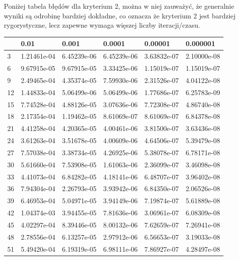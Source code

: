 \documentclass{article}
\begin{document}
Poniżej tabela błędów dla kryterium 2, można w niej zauważyć, że generalnie wyniki są odrobinę bardziej dokładne,
co oznacza że kryterium 2 jest bardziej rygorystyczne, lecz zapewne wymaga więszej liczby iteracji/czasu.

\newpage
\thispagestyle{empty}

\begin{table}[H]
\centering
\begin{tabular}{|l|l|l|l|l|l|}
\hline
& 0.01 & 0.001 & 0.0001 & 0.00001 & 0.000001 \\ \hline
3 & 1.21461e-04 & 6.45239e-06 & 6.45239e-06 & 3.63832e-07 & 2.10000e-08 \\ \hline
6 & 9.67915e-05 & 9.67915e-05 & 3.33425e-06 & 1.15019e-07 & 1.15019e-07 \\ \hline
9 & 2.49465e-04 & 4.35374e-05 & 7.59930e-06 & 2.31526e-07 & 4.04122e-08 \\ \hline
12 & 1.44833e-04 & 5.06499e-06 & 5.06499e-06 & 1.77686e-07 & 6.25783e-09 \\ \hline
15 & 7.74528e-04 & 4.88126e-05 & 3.07636e-06 & 7.72308e-07 & 4.86740e-08 \\ \hline
18 & 2.17354e-04 & 1.19462e-05 & 8.61069e-07 & 8.61069e-07 & 6.84378e-08 \\ \hline
21 & 4.41258e-04 & 4.20365e-05 & 4.00461e-06 & 3.81500e-07 & 3.63436e-08 \\ \hline
24 & 3.61263e-04 & 3.51678e-05 & 4.00609e-06 & 4.64506e-07 & 5.39479e-08 \\ \hline
27 & 7.57038e-04 & 3.38734e-05 & 4.26925e-06 & 5.38078e-07 & 6.78171e-08 \\ \hline
30 & 5.61660e-04 & 7.53908e-05 & 1.61063e-06 & 2.36099e-07 & 3.46098e-08 \\ \hline
33 & 4.41073e-04 & 6.84282e-05 & 4.18141e-06 & 6.48707e-07 & 3.96402e-08 \\ \hline
36 & 7.94304e-04 & 2.26793e-05 & 3.93942e-06 & 6.84350e-07 & 2.06526e-08 \\ \hline
39 & 6.46953e-04 & 5.04971e-05 & 3.94149e-06 & 7.19874e-07 & 5.61889e-08 \\ \hline
42 & 1.04374e-03 & 3.94455e-05 & 7.81636e-06 & 3.06961e-07 & 6.08309e-08 \\ \hline
45 & 4.02297e-04 & 8.39446e-05 & 8.00132e-06 & 7.62659e-07 & 7.26941e-08 \\ \hline
48 & 2.78556e-04 & 6.13257e-05 & 2.97912e-06 & 6.56653e-07 & 3.19033e-08 \\ \hline
51 & 5.49420e-04 & 6.19319e-05 & 6.98111e-06 & 7.86927e-07 & 4.28497e-08 \\ \hline

\end{tabular}
\end{table}
\end{document}
